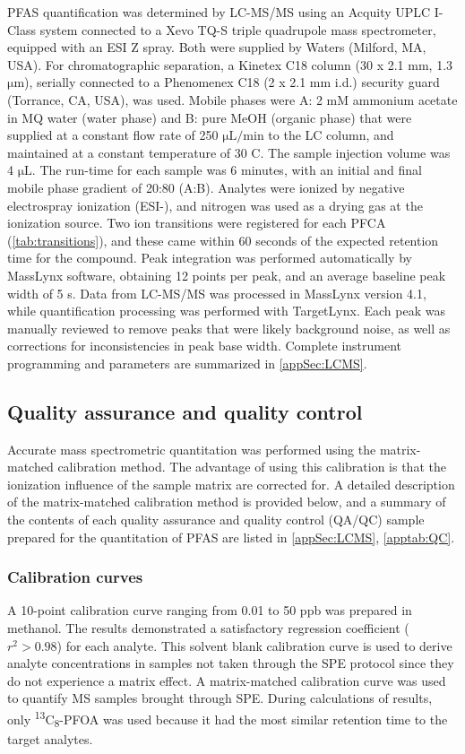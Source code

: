 

PFAS quantification was determined by \acrshort{LC-MS/MS} using an Acquity UPLC I-Class system connected to a Xevo TQ-S triple quadrupole mass spectrometer, equipped with an ESI Z spray. Both were supplied by Waters (Milford, MA, USA). For chromatographic separation, a Kinetex C18 column (30 x 2.1 mm, 1.3 $\mathrm{\mu m}$), serially connected to a Phenomenex C18 (2 x 2.1 mm i.d.) security guard (Torrance, CA, USA), was used. Mobile phases were A: 2 mM ammonium acetate in MQ water (water phase) and B: pure MeOH (organic phase) that were supplied at a constant flow rate of 250 $\mathrm{\mu L/min}$ to the LC column, and maintained at a constant temperature of 30 \textdegree C. The sample injection volume was 4 $\mathrm{\mu L}$. The run-time for each sample was 6 minutes, with an initial and final mobile phase gradient of 20:80 (A:B). Analytes were ionized by negative electrospray ionization (\acrshort{ESI}-), and nitrogen was used as a drying gas at the ionization source. Two ion transitions were registered for each PFCA (\cref{tab:transitions}), and these came within 60 seconds of the expected retention time for the compound. Peak integration was performed automatically by MassLynx software, obtaining 12 points per peak, and an average baseline peak width of 5 s. Data from LC-MS/MS was processed in MassLynx version 4.1, while quantification processing was performed with TargetLynx. Each peak was manually reviewed to remove peaks that were likely background noise, as well as corrections for inconsistencies in peak base width. Complete instrument programming and parameters are summarized in \cref{appSec:LCMS}.

\subsection{Quality assurance and quality control}
Accurate mass spectrometric quantitation was performed using the matrix-matched calibration method. The advantage of using this calibration is that the ionization influence of the sample matrix are corrected for. A detailed description of the matrix-matched calibration method is provided below, and a summary of the contents of each quality assurance and quality control (QA/QC) sample prepared for the quantitation of PFAS are listed in \cref{appSec:LCMS}, \cref{apptab:QC}. 

\subsubsection{Calibration curves}
A 10-point calibration curve ranging from 0.01 to 50 ppb was prepared in methanol. The results demonstrated a satisfactory regression coefficient ($r^2 > 0.98$) for each analyte. This solvent blank calibration curve is used to derive analyte concentrations in samples not taken through the SPE protocol since they do not experience a matrix effect. A matrix-matched calibration curve was used to quantify MS samples brought through SPE. During calculations of results, only \textsuperscript{13}C\textsubscript{8}-PFOA was used because it had the most similar retention time to the target analytes. 

